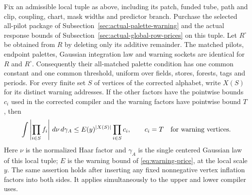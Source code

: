 \begin{lemma}
\label{lem:actual-neutral-warning}
Fix an admissible local tuple as above, including its patch, funded tube,
path and clip, coupling, chart, mask widths and predictor branch. Purchase
the selected all-pilot package of
Subsection~\ref{sec:actual-palette-warning} and the actual response bounds
of Subsection~\ref{sec:actual-global-row-prices} on this tuple.
Let $R^\circ$ be obtained from $R$ by deleting only its additive
remainder. The matched pilots, endpoint palettes, Gaussian integration
law and warning sockets are identical for $R$ and $R^\circ$.
Consequently their all-matched palette condition has one common constant
and one common threshold, uniform over fields, stores, forests, tags and
periods. For every finite set $S$ of vertices of the corrected alphabet,
write $X(S)$ for its distinct warning addresses. If the other factors
have the pointwise bounds $c_i$ used in the corrected compiler and the
warning factors have pointwise bound $T$, then
\begin{equation}\label{eq:actual-corrected-warning-product}
 \int\left|\prod_{i\in S}f_i\right|\,d\nu\,d\gamma_A
 \le E(y)^{|X(S)|}\prod_{i\in S}c_i,
 \qquad c_i=T\quad\hbox{for warning vertices}.
\end{equation}
Here $\nu$ is the normalized Haar factor and $\gamma_A$ is the single
centered Gaussian law of this local tuple; $E$ is the warning bound of
\eqref{eq:warning-price}, at the local scale $y$. The same assertion holds
after inserting any fixed nonnegative vertex inflation factors into both
sides. It applies simultaneously to the upper and lower compiler uses.
\end{lemma}

